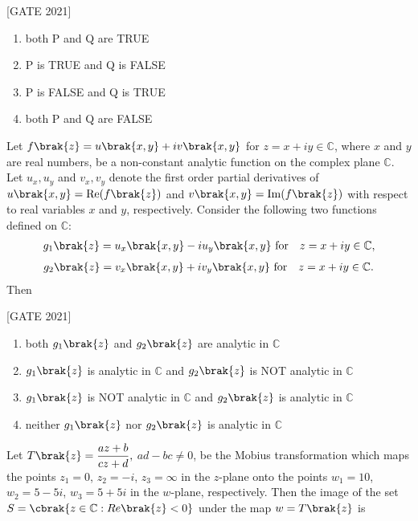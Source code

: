 \hfill{[GATE 2021]}\begin{multicols}{2}
    \begin{enumerate}
        \item both P and Q are TRUE
        \item P is TRUE and Q is FALSE
        \item P is FALSE and Q is TRUE
        \item both P and Q are FALSE
    \end{enumerate}
\end{multicols}  
\item Let $ f\brak{z} = u\brak{x,y} + i  v\brak{x,y} $ for $ z = x + i y \in \mathbb{C} $, where $ x $ and $ y $ are real numbers, be a non-constant analytic function on the complex plane $ \mathbb{C} $. Let $ u_x, u_y $ and $ v_x, v_y $ denote the first order partial derivatives of $ u\brak{x,y} = \operatorname{Re}(f\brak{z}) $ and $ v\brak{x,y} = \operatorname{Im}(f\brak{z}) $ with respect to real variables $ x $ and $ y $, respectively. Consider the following two functions defined on $ \mathbb{C} $:
\begin{align*}
       g_1\brak{z} = u_x\brak{x,y} - i u_y\brak{x,y} \text{ for} \quad z = x + iy \in \mathbb{C},
\end{align*}
\begin{align*}g_2\brak{z} = v_x\brak{x,y} + i v_y\brak{x,y}   
\text{ for} \quad z = x + iy \in \mathbb{C}.
\end{align*}
Then

\hfill{[GATE 2021]}

    \begin{enumerate}
        \item both $ g_1\brak{z} $ and $ g_2\brak{z} $ are analytic in $ \mathbb{C} $
        \item $ g_1\brak{z} $ is analytic in $ \mathbb{C} $ and $ g_2\brak{z} $ is NOT analytic in $ \mathbb{C} $
        \item $ g_1\brak{z} $ is NOT analytic in $ \mathbb{C} $ and $ g_2\brak{z} $ is analytic in $ \mathbb{C} $\item neither $ g_1\brak{z} $ nor $ g_2\brak{z} $ is analytic in $ \mathbb{C} $
    \end{enumerate}



\item 
Let $ T\brak{z} = \dfrac{az + b}{cz   + d},$   $ad - bc \neq 0 $, be the Mobius transformation which maps the points $ z_1 = 0   $, $ z_2 = -i $, $ z_3 = \infty $ in the $ z  $-plane onto the points $   w_1 =   10 $, $ w_2 =5 - 5i $, $ w_3 =5 + 5i $ in the $ w   $-plane, respectively. Then the image of the set $ S   = \cbrak{  z \in \mathbb{C} : Re\brak{z} < 0 } $ under the map $ w   = T\brak{z} $ is

